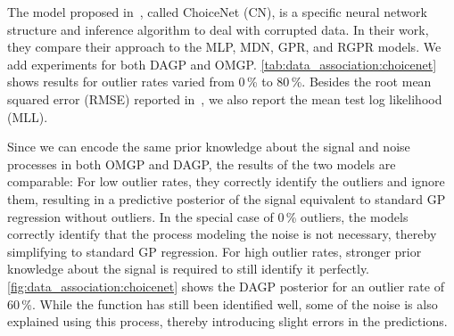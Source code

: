 The model proposed in~\parencite{choi_choicenet_2018}, called ChoiceNet (CN), is a specific neural network structure and inference algorithm to deal with corrupted data.
In their work, they compare their approach to the MLP, MDN, GPR, and RGPR models.
We add experiments for both DAGP and OMGP.
\cref{tab:data_association:choicenet} shows results for outlier rates varied from 0\,\% to 80\,\%.
Besides the root mean squared error (RMSE) reported in~\parencite{choi_choicenet_2018}, we also report the mean test log likelihood (MLL).

Since we can encode the same prior knowledge about the signal and noise processes in both OMGP and DAGP, the results of the two models are comparable:
For low outlier rates, they correctly identify the outliers and ignore them, resulting in a predictive posterior of the signal equivalent to standard GP regression without outliers.
In the special case of 0\,\% outliers, the models correctly identify that the process modeling the noise is not necessary, thereby simplifying to standard GP regression.
For high outlier rates, stronger prior knowledge about the signal is required to still identify it perfectly.
\cref{fig:data_association:choicenet} shows the DAGP posterior for an outlier rate of 60\,\%.
While the function has still been identified well, some of the noise is also explained using this process, thereby introducing slight errors in the predictions.


